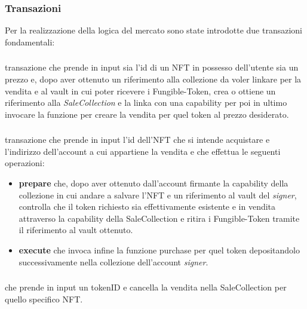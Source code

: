 \subsubsection{Transazioni}
Per la realizzazione della logica del mercato sono state introdotte due transazioni fondamentali:
\subsubsection*{ }transazione che prende in input sia l'id di un NFT in possesso dell'utente sia un prezzo e, dopo aver ottenuto un riferimento alla collezione da voler linkare per la vendita e al vault in cui poter ricevere i Fungible-Token, crea o ottiene un riferimento alla \textit{SaleCollection} e la linka con una capability per poi in ultimo invocare la funzione  per creare la vendita per quel token al prezzo desiderato.

\subsubsection*{}transazione che prende in input l'id dell'NFT che si intende acquistare e l'indirizzo dell'account a cui appartiene la vendita e che effettua le seguenti operazioni:
\begin{itemize}
    \item \textbf{prepare} che, dopo aver ottenuto dall'account firmante la capability della collezione in cui andare a salvare l'NFT e un riferimento al vault del \textit{signer}, controlla che il token richiesto sia effettivamente esistente e in vendita attraverso la capability della SaleCollection e ritira i Fungible-Token tramite il riferimento al vault ottenuto.
    \item \textbf{execute} che invoca infine la funzione purchase per quel token depositandolo successivamente nella collezione dell'account \textit{signer}.
\end{itemize}

\subsubsection*{}che prende in input un tokenID e cancella la vendita nella SaleCollection per quello specifico NFT.
